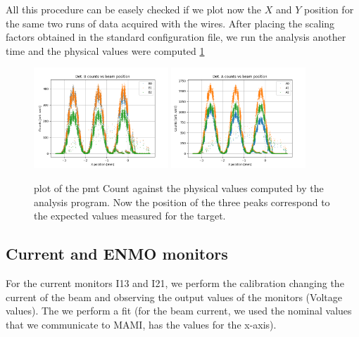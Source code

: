 {All this procedure can be easely checked if we plot now the $X$ and $Y$ position for the same two runs of data acquired with the wires. After placing the scaling factors obtained in the standard configuration file, we run the analysis another time and the physical values were computed \ref{fig:CheckHori}

\begin{figure}[hbtp]
\centering
\includegraphics[width=0.45\textwidth]{Analysis/XcheckB.png} 
\includegraphics[width=0.45\textwidth]{Analysis/XcheckA.png}
\caption{plot of the pmt Count against the physical values computed by the analysis program. Now the position of the three peaks correspond to the expected values measured for the target.}
\label{fig:CheckHori}
\end{figure}


\subsection{Current and ENMO monitors}

For the current monitors I13 and I21, we perform the calibration changing the current of the beam and observing the output values of the monitors (Voltage values). The we perform a fit (for the beam current, we used the nominal values that we communicate to MAMI, has the values for the x-axis).

}
